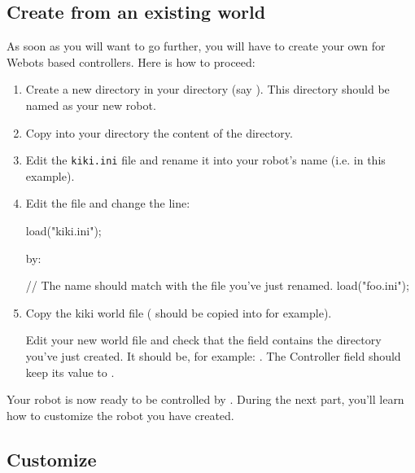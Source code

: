 \subsection{Create from an existing world}

As soon as you will want to go further, you will have to create your
own \urbi for Webots based controllers. Here is how to proceed:

\begin{enumerate}

\item Create a new directory in your  directory (say
  ). This directory should be named as your new robot.

\item Copy into your  directory the content of the
   directory.

\item Edit the \nolinkurl{kiki.ini} file and rename it into your
  robot's name (i.e.  in this example).

\item Edit the  file and change the line:

\begin{urbifixme}
load("kiki.ini");
\end{urbifixme}

by:

\begin{urbifixme}
// The name should match with the file you've just renamed.
load("foo.ini");
\end{urbifixme}

\item Copy the kiki world file ( should be
  copied into  for example).

  Edit your new world file and check that the field
   contains the directory you've just created. It
  should be, for example: .  The Controller field should
  keep its value to .
\end{enumerate}

Your robot is now ready to be controlled by \urbi. During the next
part, you'll learn how to customize the robot you have created.


\subsection{Customize}

